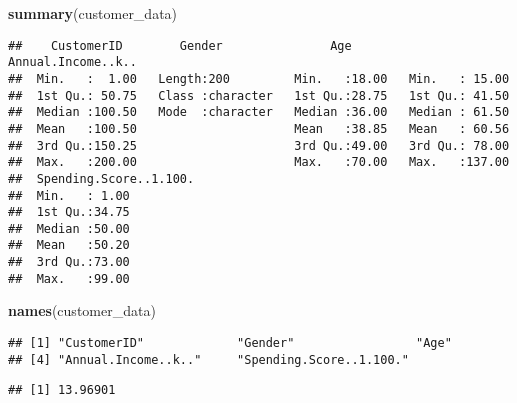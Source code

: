 \documentclass[
]{article}
\newenvironment{Shaded}{\begin{snugshade}}{\end{snugshade}}
\newcommand{\CommentTok}[1]{\textcolor[rgb]{0.56,0.35,0.01}{\textit{#1}}}
\newcommand{\FunctionTok}[1]{\textcolor[rgb]{0.13,0.29,0.53}{\textbf{#1}}}
\newcommand{\NormalTok}[1]{#1}
\newcommand{\OtherTok}[1]{\textcolor[rgb]{0.56,0.35,0.01}{#1}}
\newcommand{\SpecialCharTok}[1]{\textcolor[rgb]{0.81,0.36,0.00}{\textbf{#1}}}
\newcommand{\StringTok}[1]{\textcolor[rgb]{0.31,0.60,0.02}{#1}}
\begin{document}
\begin{Shaded}
\begin{Highlighting}[]
\FunctionTok{summary}\NormalTok{(customer\_data)}
\end{Highlighting}
\end{Shaded}

\begin{verbatim}
##    CustomerID        Gender               Age        Annual.Income..k..
##  Min.   :  1.00   Length:200         Min.   :18.00   Min.   : 15.00    
##  1st Qu.: 50.75   Class :character   1st Qu.:28.75   1st Qu.: 41.50    
##  Median :100.50   Mode  :character   Median :36.00   Median : 61.50    
##  Mean   :100.50                      Mean   :38.85   Mean   : 60.56    
##  3rd Qu.:150.25                      3rd Qu.:49.00   3rd Qu.: 78.00    
##  Max.   :200.00                      Max.   :70.00   Max.   :137.00    
##  Spending.Score..1.100.
##  Min.   : 1.00         
##  1st Qu.:34.75         
##  Median :50.00         
##  Mean   :50.20         
##  3rd Qu.:73.00         
##  Max.   :99.00
\end{verbatim}

\begin{Shaded}
\begin{Highlighting}[]
\FunctionTok{names}\NormalTok{(customer\_data)}
\end{Highlighting}
\end{Shaded}

\begin{verbatim}
## [1] "CustomerID"             "Gender"                 "Age"                   
## [4] "Annual.Income..k.."     "Spending.Score..1.100."
\end{verbatim}

\begin{Shaded}
\end{Shaded}

\begin{verbatim}
## [1] 13.96901
\end{verbatim}
\end{document}
